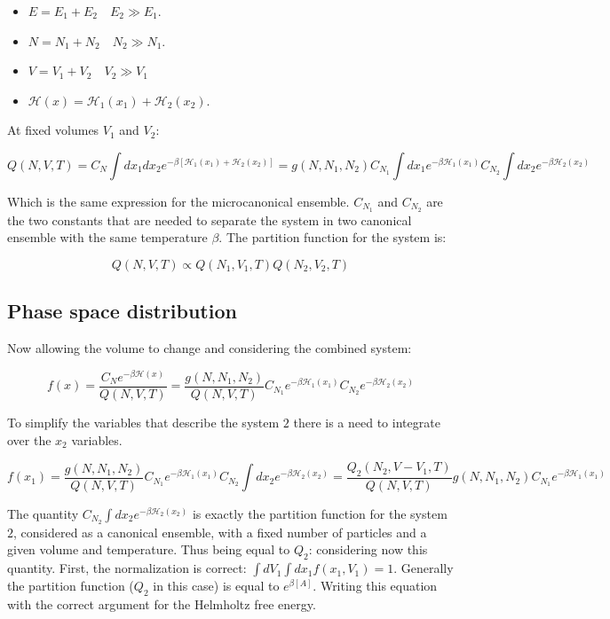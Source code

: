 \begin{multicols}{2}
	\begin{itemize}
		\item $E = E_1 + E_2\quad E_2\gg E_1$.
		\item $N = N_1 + N_2\quad N_2\gg N_1$.
		\item $V = V_1 + V_2\quad V_2\gg V_1$
		\item $\mathcal{H}(x) = \mathcal{H}_1(x_1) + \mathcal{H}_2(x_2)$.
	\end{itemize}
\end{multicols}


At fixed volumes $V_1$ and $V_2$:

$$Q(N, V, T) = C_N\int dx_1dx_2 e^{-\beta[\mathcal{H}_1(x_1) + \mathcal{H}_2(x_2)]} = g(N, N_1, N_2)C_{N_1}\int dx_1 e^{-\beta\mathcal{H}_1(x_1)}C_{N_2}\int dx_2 e^{-\beta\mathcal{H}_2(x_2)}$$

Which is the same expression for the microcanonical ensemble.
$C_{N_1}$ and $C_{N_2}$ are the two constants that are needed to separate the system in two canonical ensemble with the same temperature $\beta$.
The partition function for the system is:

$$Q(N, V, T) \propto Q(N_1, V_1, T)Q(N_2, V_2, T)$$

	\subsection{Phase space distribution}
	Now allowing the volume to change and considering the combined system:

	$$f(x) = \frac{C_Ne^{-\beta\mathcal{H}(x)}}{Q(N, V, T)} = \frac{g(N, N_1, N_2)}{Q(N, V, T)}C_{N_1}e^{-\beta\mathcal{H}_1(x_1)}C_{N_2}e^{-\beta\mathcal{H}_2(x_2)}$$

	To simplify the variables that describe the system $2$ there is a need to integrate over the $x_2$ variables.

	$$f(x_1) = \frac{g(N, N_1, N_2)}{Q(N, V, T)}C_{N_1}e^{-\beta\mathcal{H}_1(x_1)}C_{N_2}\int dx_2 e^{-\beta\mathcal{H}_2(x_2)} = \frac{Q_2(N_2, V-V_1, T)}{Q(N, V, T)}g(N, N_1, N_2)C_{N_1}e^{-\beta\mathcal{H}_1(x_1)}$$

	The quantity $C_{N_2}\int dx_2 e^{-\beta\mathcal{H}_2(x_2)}$ is exactly the partition function for the system $2$, considered as a canonical ensemble, with a fixed number of particles and a given volume and temperature.
	Thus being equal to $Q_2$: considering now this quantity.
	First, the normalization is correct: $\int dV_1\int dx_1f(x_1, V_1) = 1$.
	Generally the partition function ($Q_2$ in this case) is equal to $e^{\beta[A]}$.
	Writing this equation with the correct argument for the Helmholtz free energy.

